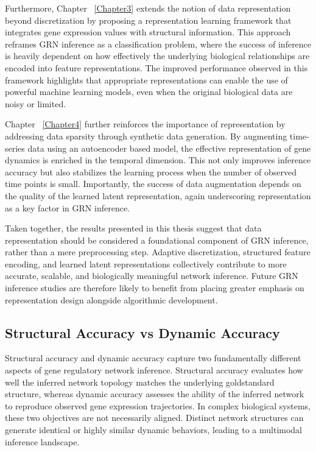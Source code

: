 Furthermore, Chapter ~\ref{Chapter3} extends the notion of data representation beyond discretization by proposing a representation learning framework that integrates gene expression values with structural information. This approach reframes GRN inference as a classification problem, where the success of inference is heavily dependent on how effectively the underlying biological relationships are encoded into feature representations. The improved performance observed in this framework highlights that appropriate representations can enable the use of powerful machine learning models, even when the original biological data are noisy or limited.

Chapter ~\ref{Chapter4} further reinforces the importance of representation by addressing data sparsity through synthetic data generation. By augmenting time-series data using an autoencoder based model, the effective representation of gene dynamics is enriched in the temporal dimension. This not only improves inference accuracy but also stabilizes the learning process when the number of observed time points is small. Importantly, the success of data augmentation depends on the quality of the learned latent representation, again underscoring representation as a key factor in GRN inference.

Taken together, the results presented in this thesis suggest that data representation should be considered a foundational component of GRN inference, rather than a mere preprocessing step. Adaptive discretization, structured feature encoding, and learned latent representations collectively contribute to more accurate, scalable, and biologically meaningful network inference. Future GRN inference studies are therefore likely to benefit from placing greater emphasis on representation design alongside algorithmic development.

\subsection{Structural Accuracy vs Dynamic Accuracy}
Structural accuracy and dynamic accuracy capture two fundamentally different aspects of gene regulatory network inference. Structural accuracy evaluates how well the inferred network topology matches the underlying goldstandard structure, whereas dynamic accuracy assesses the ability of the inferred network to reproduce observed gene expression trajectories. In complex biological systems, these two objectives are not necessarily aligned. Distinct network structures can generate identical or highly similar dynamic behaviors, leading to a multimodal inference landscape.

